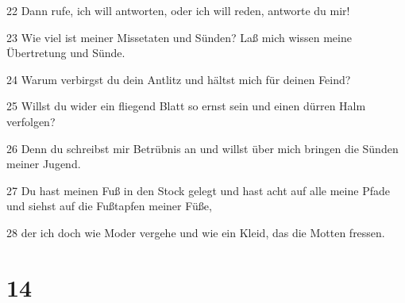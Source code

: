 \par 22 Dann rufe, ich will antworten, oder ich will reden, antworte du mir!
\par 23 Wie viel ist meiner Missetaten und Sünden? Laß mich wissen meine Übertretung und Sünde.
\par 24 Warum verbirgst du dein Antlitz und hältst mich für deinen Feind?
\par 25 Willst du wider ein fliegend Blatt so ernst sein und einen dürren Halm verfolgen?
\par 26 Denn du schreibst mir Betrübnis an und willst über mich bringen die Sünden meiner Jugend.
\par 27 Du hast meinen Fuß in den Stock gelegt und hast acht auf alle meine Pfade und siehst auf die Fußtapfen meiner Füße,
\par 28 der ich doch wie Moder vergehe und wie ein Kleid, das die Motten fressen.

\chapter{14}

